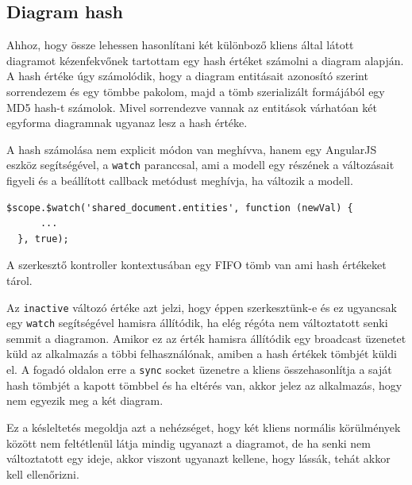 \label{subsec:hashref}
\subsection{Diagram hash}

Ahhoz, hogy össze lehessen hasonlítani két különboző kliens által látott diagramot kézenfekvőnek tartottam egy hash értéket számolni a diagram alapján. A hash értéke úgy számolódik, hogy a diagram entitásait azonosító szerint sorrendezem és egy tömbbe pakolom, majd a tömb szerializált formájából egy MD5 hash-t számolok. Mivel sorrendezve vannak az entitások várhatóan két egyforma diagramnak ugyanaz lesz a hash értéke.

A hash számolása nem explicit módon van meghívva, hanem egy AngularJS eszköz segítségével, a \lstinline{watch} paranccsal, ami a modell egy részének a változásait figyeli és a beállított callback metódust meghívja, ha változik a modell.

\begin{lstlisting}[caption=Modell módosításaira meghívódó callback]
  $scope.$watch('shared_document.entities', function (newVal) {
      ...
  }, true);
\end{lstlisting}

A szerkesztő kontroller kontextusában egy FIFO tömb van ami hash értékeket tárol.

Az \lstinline{inactive} változó értéke azt jelzi, hogy éppen szerkesztünk-e és ez ugyancsak egy \lstinline{watch} segítségével hamisra állítódik, ha elég régóta nem változtatott senki semmit a diagramon. Amikor ez az érték hamisra állítódik egy broadcast üzenetet küld az alkalmazás a többi felhasználónak, amiben a hash értékek tömbjét küldi el. A fogadó oldalon erre a \lstinline{sync} socket üzenetre a kliens összehasonlítja a saját hash tömbjét a kapott tömbbel és ha eltérés van, akkor jelez az alkalmazás, hogy nem egyezik meg a két diagram.

Ez a késleltetés megoldja azt a nehézséget, hogy két kliens normális körülmények között nem feltétlenül látja mindig ugyanazt a diagramot, de ha senki nem változtatott egy ideje, akkor viszont ugyanazt kellene, hogy lássák, tehát akkor kell ellenőrizni.











